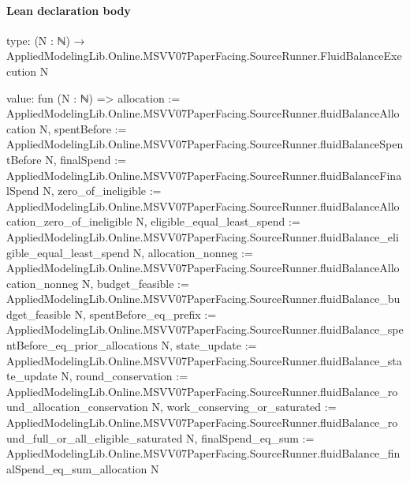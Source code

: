 \documentclass[10pt]{article}
\begin{document}
\paragraph{Lean declaration body}
\begin{ReviewVerbatim}
type:
(N : ℕ) → AppliedModelingLib.Online.MSVV07PaperFacing.SourceRunner.FluidBalanceExecution N

value:
fun (N : ℕ) =>
  { allocation := AppliedModelingLib.Online.MSVV07PaperFacing.SourceRunner.fluidBalanceAllocation N,
    spentBefore := AppliedModelingLib.Online.MSVV07PaperFacing.SourceRunner.fluidBalanceSpentBefore N,
    finalSpend := AppliedModelingLib.Online.MSVV07PaperFacing.SourceRunner.fluidBalanceFinalSpend N,
    zero_of_ineligible :=
      AppliedModelingLib.Online.MSVV07PaperFacing.SourceRunner.fluidBalanceAllocation_zero_of_ineligible N,
    eligible_equal_least_spend :=
      AppliedModelingLib.Online.MSVV07PaperFacing.SourceRunner.fluidBalance_eligible_equal_least_spend N,
    allocation_nonneg := AppliedModelingLib.Online.MSVV07PaperFacing.SourceRunner.fluidBalanceAllocation_nonneg N,
    budget_feasible := AppliedModelingLib.Online.MSVV07PaperFacing.SourceRunner.fluidBalance_budget_feasible N,
    spentBefore_eq_prefix :=
      AppliedModelingLib.Online.MSVV07PaperFacing.SourceRunner.fluidBalance_spentBefore_eq_prior_allocations N,
    state_update := AppliedModelingLib.Online.MSVV07PaperFacing.SourceRunner.fluidBalance_state_update N,
    round_conservation :=
      AppliedModelingLib.Online.MSVV07PaperFacing.SourceRunner.fluidBalance_round_allocation_conservation N,
    work_conserving_or_saturated :=
      AppliedModelingLib.Online.MSVV07PaperFacing.SourceRunner.fluidBalance_round_full_or_all_eligible_saturated N,
    finalSpend_eq_sum :=
      AppliedModelingLib.Online.MSVV07PaperFacing.SourceRunner.fluidBalance_finalSpend_eq_sum_allocation N }
\end{ReviewVerbatim}
\end{document}
